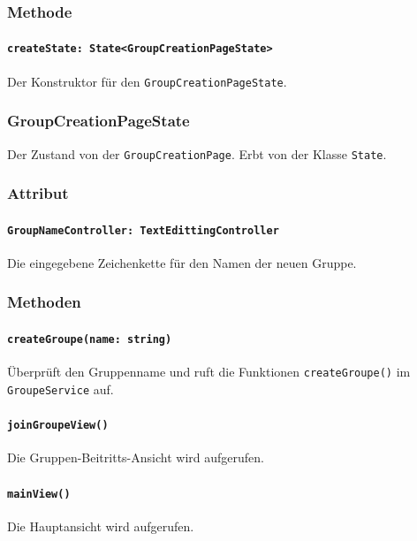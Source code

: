 \documentclass{entwurfsheft}
\begin{document}
        \subsubsection*{Methode}
            \paragraph*{\texttt{createState: State<GroupCreationPageState>}} Der Konstruktor für den \texttt{GroupCreationPageState}.
    
    \subsubsection{GroupCreationPageState}
    Der Zustand von der \texttt{GroupCreationPage}. Erbt von der Klasse \texttt{State}.
        \subsubsection*{Attribut}
            \paragraph*{\texttt{GroupNameController: TextEdittingController}} Die eingegebene Zeichenkette für den Namen der neuen Gruppe.

        \subsubsection*{Methoden}
            \paragraph*{\texttt{createGroupe(name: string)}} Überprüft den Gruppenname und ruft die Funktionen \texttt{createGroupe()} im \texttt{GroupeService} auf.
            \paragraph*{\texttt{joinGroupeView()}} Die Gruppen-Beitritts-Ansicht wird aufgerufen.
            \paragraph*{\texttt{mainView()}} Die Hauptansicht wird aufgerufen.
\end{document}
